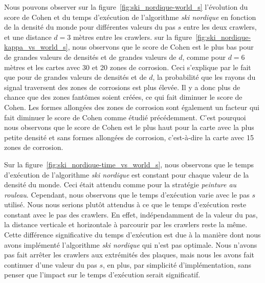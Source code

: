 \documentclass[english,RandD]{rapportPFE}  %
\begin{document}
			Nous pouvons observer sur la figure~\ref{fig:ski_nordique-world_s} l'évolution du score de Cohen et du temps d'exécution de l'algorithme \textit{ski nordique} en fonction de la densité du monde pour différentes valeurs du pas $s$ entre les deux crawlers, et une distance $d = 3$ mètres entre les crawlers.
			sur la figure~\ref{fig:ski_nordique-kappa_vs_world_s}, nous observons que le score de Cohen est le plus bas pour de grandes valeurs de densités et de grandes valeurs de $d$, comme pour $d = 6$ mètres et les cartes avec 30 et 20 zones de corrosion.
			Ceci s'explique par le fait que pour de grandes valeurs de densités et de $d$, la probabilité que les rayons du signal traversent des zones de corrosions est plus élevée.
			Il y a donc plus de chance que des zones fantômes soient créées, ce qui fait diminuer le score de Cohen.
			Les formes allongées des zones de corrosion sont également un facteur qui fait diminuer le score de Cohen comme étudié précédemment.
			C'est pourquoi nous observons que le score de Cohen est le plus haut pour la carte avec la plus petite densité et sans formes allongées de corrosion, c'est-à-dire la carte avec 15 zones de corrosion.

			Sur la figure~\ref{fig:ski_nordique-time_vs_world_s}, nous observons que le temps d'exécution de l'algorithme \textit{ski nordique} est constant pour chaque valeur de la densité du monde.
			Ceci était attendu comme pour la stratégie \textit{peinture au rouleau}.
			Cependant, nous observons que le temps d'exécution varie avec le pas $s$ utilisé.
			Nous nous serions plutôt attendus à ce que le temps d'exécution reste constant avec le pas des crawlers.
			En effet, indépendamment de la valeur du pas, la distance verticale et horizontale à parcourir par les crawlers reste la même.
			Cette différence significative du temps d'exécution est due à la manière dont nous avons implémenté l'algorithme \textit{ski nordique} qui n'est pas optimale.
			Nous n'avons pas fait arrêter les crawlers aux extrémités des plaques, mais nous les avons fait continuer d'une valeur du pas $s$, en plus, par simplicité d'implémentation, sans penser que l'impact sur le temps d'exécution serait significatif.
\end{document}
